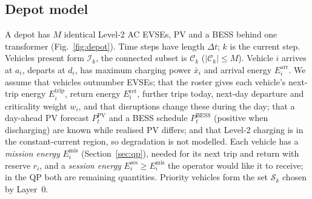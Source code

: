 \documentclass[preprint,12pt]{elsarticle}
\newcommand{\Ses}{E^{\mathrm{ses}}}
\newcommand{\Mis}{E^{\mathrm{mis}}}
\newcommand{\Cset}{\mathcal{C}_k}
\newcommand{\Sset}{\mathcal{S}_k}
\begin{document}
\subsection{Depot model}
A depot has $M$ identical Level-2 AC EVSEs, PV and a BESS behind one transformer (Fig.~\ref{fig:depot}). Time
steps have length $\Delta t$; $k$ is the current step. Vehicles present form $\mathcal{I}_k$, the connected
subset is $\Cset$ ($|\Cset|\le M$). Vehicle $i$ arrives at $a_i$, departs at $d_i$, has maximum charging
power $\bar{x}_i$ and arrival energy $E^{\mathrm{arr}}_i$. We assume that vehicles outnumber EVSEs; that the
roster gives each vehicle's next-trip energy $E^{\mathrm{trip}}_i$, return energy $E^{\mathrm{ret}}_i$,
further trips today, next-day departure and criticality weight $w_i$, and that disruptions change these
during the day; that a day-ahead PV forecast $P^{\mathrm{PV}}_t$ and a BESS schedule $P^{\mathrm{BESS}}_t$
(positive when discharging) are known while realised PV differs; and that Level-2 charging is in the
constant-current region, so degradation is not modelled. Each vehicle has a \emph{mission energy} $\Mis_i$
(Section~\ref{sec:qp}), needed for its next trip and return with reserve $r_i$, and a \emph{session energy}
$\Ses_i\ge\Mis_i$ the operator would like it to receive; in the QP both are remaining quantities. Priority
vehicles form the set $\Sset$ chosen by Layer~0.
\end{document}
